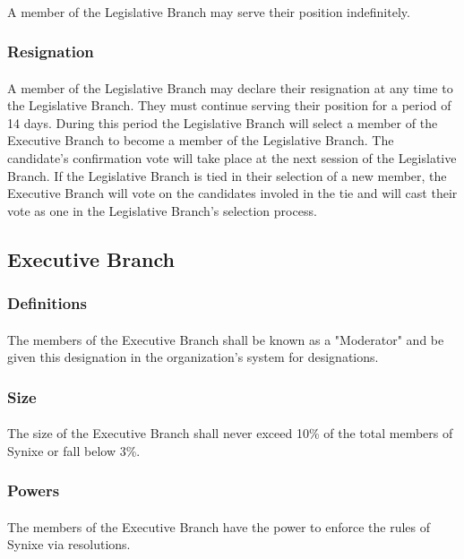 \documentclass[10pt,a4paper]{article}
\begin{document}
\paragraph{}
A member of the Legislative Branch may serve their position indefinitely.
\subsubsection{Resignation}
\paragraph{}
A member of the Legislative Branch may declare their resignation at any time to the Legislative Branch. They must continue serving their position for a period of 14 days. During this period the Legislative Branch will select a member of the Executive Branch to become a member of the Legislative Branch. The candidate's confirmation vote will take place at the next session of the Legislative Branch. If the Legislative Branch is tied in their selection of a new member, the Executive Branch will vote on the candidates involed in the tie and will cast their vote as one in the Legislative Branch's selection process.
\subsection{Executive Branch}
\subsubsection{Definitions}
\paragraph{}
The members of the Executive Branch shall be known as a "Moderator" and be given this designation in the organization's system for designations.
\subsubsection{Size}
\paragraph{}
The size of the Executive Branch shall never exceed 10\% of the total members of Synixe or fall below 3\%.
\subsubsection{Powers}
\paragraph{}
The members of the Executive Branch have the power to enforce the rules of Synixe via resolutions.
\end{document}
